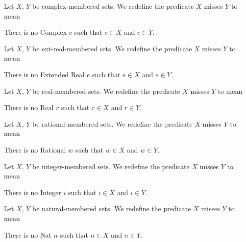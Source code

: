 \documentclass{article}
\begin{document}
\begin{definition}
Let $X$, $Y$ be complex-membered sets.
We redefine the predicate $X$ misses $Y$ to mean
\begin{defn}
\item There is no Complex $c$ such that $c\in X$ and $c\in Y$.
\end{defn}
\end{definition}

\begin{definition}
Let $X$, $Y$ be ext-real-membered sets.
We redefine the predicate $X$ misses $Y$ to mean
\begin{defn}
\item There is no Extended Real $e$ such that $e\in X$ and $e\in Y$.
\end{defn}
\end{definition}

\begin{definition}
Let $X$, $Y$ be real-membered sets.
We redefine the predicate $X$ misses $Y$ to mean
\begin{defn}
\item There is no Real $r$ such that $r\in X$ and $r\in Y$.
\end{defn}
\end{definition}

\begin{definition}
Let $X$, $Y$ be rational-membered sets.
We redefine the predicate $X$ misses $Y$ to mean
\begin{defn}
\item There is no Rational $w$ such that $w\in X$ and $w\in Y$.
\end{defn}
\end{definition}

\begin{definition}
Let $X$, $Y$ be integer-membered sets.
We redefine the predicate $X$ misses $Y$ to mean
\begin{defn}
\item There is no Integer $i$ such that $i\in X$ and $i\in Y$.
\end{defn}
\end{definition}

\begin{definition}
Let $X$, $Y$ be natural-membered sets.
We redefine the predicate $X$ misses $Y$ to mean
\begin{defn}
\item There is no Nat $n$ such that $n\in X$ and $n\in Y$.
\end{defn}
\end{definition}
\end{document}
